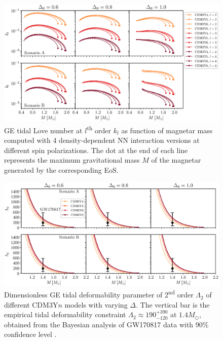 \begin{figure}[ht!]
        \centering
        \includegraphics[width=\textwidth]{fig/kl.eps}
        \caption{\gls{GE} tidal Love number at $l$\textsuperscript{th} order $k_l$ as function of magnetar mass computed with 4 density-dependent \gls{NN} interaction versions at different spin polarizations. The dot at the end of each line represents the maximum gravitational mass $M$ of the magnetar generated by the corresponding \gls{EoS}.}
        \label{fig:kl}
\end{figure} 
\begin{figure}[ht!]
    \centering
    \includegraphics[width=\textwidth]{fig/Lambda2.eps}
    \caption{Dimensionless \gls{GE} tidal deformability parameter of 2\textsuperscript{nd} order $\Lambda_2$ of different CDM3Y$n$ models with varying $\Delta$. The vertical bar is the empirical tidal deformability constraint $\Lambda_2 \approx 190_{-120}^{+390}$ at $1.4M_\odot$, obtained from the Bayesian analysis of GW170817 data with 90\% confidence level \citep{abbott2018gw170817}.}
    \label{fig:Lambda2}
\end{figure} 
